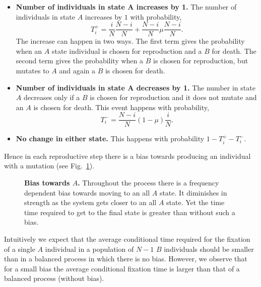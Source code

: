 \documentclass[oneside,11pt,a4paper]{book}
\begin{document}
%
\begin{itemize}
\item \textbf{Number of individuals in state $\mathbf{A}$ increases by 1.}
The number of individuals in state $A$ increases by $1$ with probability,
%
\begin{equation}
T_i^+ = \frac{i}{N} \frac{N-i}{N} + \frac{N-i}{N} \mu \frac{N-i}{N}.
\end{equation}
%
The increase can happen in two ways.
The first term gives the probability when an $A$ state individual is chosen for reproduction and a $B$ for death.
The second term gives the probability when a $B$ is chosen for reproduction, but mutates to $A$ and again a $B$ is chosen for death.

\item \textbf{Number of individuals in state $\mathbf{A}$ decreases by 1.}
The number in state $A$ decreases only if a $B$ is chosen for reproduction and it does not mutate and an $A$ is chosen for death.
This event happens with probability,
%
\begin{equation}
T_i^- = \frac{N-i}{N} (1-\mu) \frac{i}{N}.
\end{equation}
%
\item \textbf{No change in either state.}
This happens with probability $1-T_i^+ - T_i^-$.
\end{itemize}
%

Hence in each reproductive step there is a bias towards producing an individual with a mutation (see Fig.\ \ref{fig:stoslo}).
%
\begin{figure}[h]
  \begin{center}
    \caption{\textbf{Bias towards $A$.}
\small{Throughout the process there is a frequency dependent bias towards moving to an all $A$ state.
It diminishes in strength as the system gets closer to an all $A$ state.
    Yet the time time required to get to the final state is greater than without such a bias.}
}
    \label{fig:stoslo}
  \end{center}
\end{figure}
%
Intuitively we expect that the average conditional time required for the fixation of a single $A$ individual in a population of $N-1$ $B$ individuals should be smaller than in a balanced process in which there is no bias.
However, we observe that for a small bias the average conditional fixation time is larger than that of a balanced process (without bias).
\end{document}
